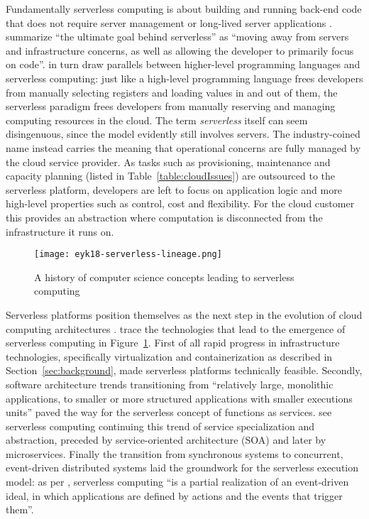 Fundamentally serverless computing is about building and running back-end code that does not require server management or long-lived server applications \parencite{robert2016serverlessarchitectures}. \textcite{sbarski2017serverless} summarize ``the ultimate goal behind serverless'' as ``moving away from servers and infrastructure concerns, as well as allowing the developer to primarily focus on code''. \textcite{jonas19berkeleyView} in turn draw parallels between higher-level programming languages and serverless computing: just like a high-level programming language frees developers from manually selecting registers and loading values in and out of them, the serverless paradigm frees developers from manually reserving and managing computing resources in the cloud. The term \textit{serverless} itself can seem disingenuous, since the model evidently still involves servers. The industry-coined name instead carries the meaning that operational concerns are fully managed by the cloud service provider. As tasks such as provisioning, maintenance and capacity planning (listed in Table~\ref{table:cloudIssues}) are outsourced to the serverless platform, developers are left to focus on application logic and more high-level properties such as control, cost and flexibility. For the cloud customer this provides an abstraction where computation is disconnected from the infrastructure it runs on.

\begin{figure}[h]
  \centering
  \texttt{[image: eyk18-serverless-lineage.png]}
  \caption{A history of computer science concepts leading to serverless computing \parencite{van18fromPAAStoPresent}}
  \label{fig:serverlessLineage}
\end{figure}

Serverless platforms position themselves as the next step in the evolution of cloud computing architectures \parencite{baldini17currentTrends}. \textcite{van18fromPAAStoPresent} trace the technologies that lead to the emergence of serverless computing in Figure~\ref{fig:serverlessLineage}. First of all rapid progress in infrastructure technologies, specifically virtualization and containerization as described in Section~\ref{sec:background}, made serverless platforms technically feasible. Secondly, software architecture trends transitioning from ``relatively large, monolithic applications, to smaller or more structured applications with smaller executions units'' \parencite{van2017spec} paved the way for the serverless concept of functions as services. \textcite{van18fromPAAStoPresent} see serverless computing continuing this trend of service specialization and abstraction, preceded by service-oriented architecture (SOA) and later by microservices. Finally the transition from synchronous systems to concurrent, event-driven distributed systems laid the groundwork for the serverless execution model: as per \textcite{mcgrath17implement}, serverless computing ``is a partial realization of an event-driven ideal, in which applications are defined by actions and the events that trigger them''.

